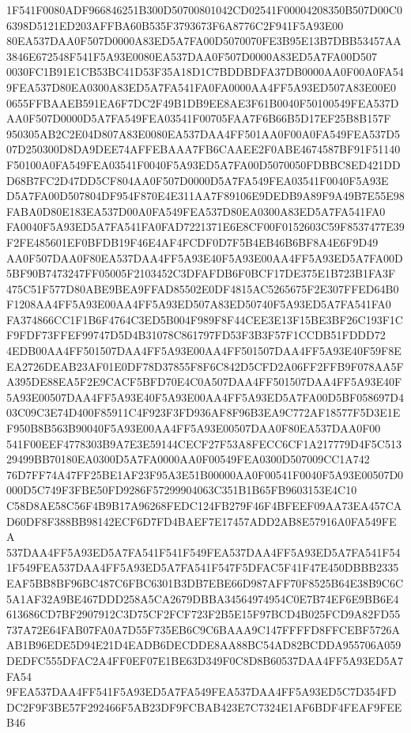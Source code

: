 \documentclass[UTF8,fontset=fandol,zihao=-4,a4paper]{ctexart}
\begin{document}
{{1F541F0080ADF966846251B300D50700801042CD02541F00004208350B507D00C06398D5121ED203AFFBA60B535F3793673F6A8776C2F941F5A93E00
80EA537DAA0F507D0000A83ED5A7FA00D5070070FE3B95E13B7DBB53457AA3846E672548F541F5A93E0080EA537DAA0F507D0000A83ED5A7FA00D507
0030FC1B91E1CB53BC41D53F35A18D1C7BDDBDFA37DB0000AA0F00A0FA549FEA537D80EA0300A83ED5A7FA541FA0FA0000AA4FF5A93ED507A83E00E0
0655FFBAAEB591EA6F7DC2F49B1DB9EE8AE3F61B0040F50100549FEA537DAA0F507D0000D5A7FA549FEA03541F00705FAA7F6B66B5D17EF25B8B157F
950305AB2C2E04D807A83E0080EA537DAA4FF501AA0F00A0FA549FEA537D507D250300D8DA9DEE74AFFEBAAA7FB6CAAEE2F0ABE4674587BF91F51140
F50100A0FA549FEA03541F0040F5A93ED5A7FA00D5070050FDBBC8ED421DDD68B7FC2D47DD5CF804AA0F507D0000D5A7FA549FEA03541F0040F5A93E
D5A7FA00D507804DF954F870E4E311AA7F89106E9DEDB9A89F9A49B7E55E98FABA0D80E183EA537D00A0FA549FEA537D80EA0300A83ED5A7FA541FA0
FA0040F5A93ED5A7FA541FA0FAD7221371E6E8CF00F0152603C59F8537477E39F2FE485601EF0BFDB19F46E4AF4FCDF0D7F5B4EB46B6BF8A4E6F9D49
AA0F507DAA0F80EA537DAA4FF5A93E40F5A93E00AA4FF5A93ED5A7FA00D5BF90B7473247FF05005F2103452C3DFAFDB6F0BCF17DE375E1B723B1FA3F
475C51F577D80ABE9BEA9FFAD85502E0DF4815AC5265675F2E307FFED64B0F1208AA4FF5A93E00AA4FF5A93ED507A83ED50740F5A93ED5A7FA541FA0
FA374866CC1F1B6F4764C3ED5B004F989F8F44CEE3E13F15BE3BF26C193F1CF9FDF73FFEF99747D5D4B31078C861797FD53F3B3F57F1CCDB51FDDD72
4EDB00AA4FF501507DAA4FF5A93E00AA4FF501507DAA4FF5A93E40F59F8EEA2726DEAB23AF01E0DF78D37855F8F6C842D5CFD2A06FF2FFB9F078AA5F
A395DE88EA5F2E9CACF5BFD70E4C0A507DAA4FF501507DAA4FF5A93E40F5A93E00507DAA4FF5A93E40F5A93E00AA4FF5A93ED5A7FA00D5BF058697D4
03C09C3E74D400F85911C4F923F3FD936AF8F96B3EA9C772AF18577F5D3E1EF950B8B563B90040F5A93E00AA4FF5A93E00507DAA0F80EA537DAA0F00
541F00EEF4778303B9A7E3E59144CECF27F53A8FECC6CF1A217779D4F5C51329499BB70180EA0300D5A7FA0000AA0F00549FEA0300D507009CC1A742
76D7FF74A47FF25BE1AF23F95A3E51B00000AA0F00541F0040F5A93E00507D0000D5C749F3FBE50FD9286F57299904063C351B1B65FB9603153E4C10
C58D8AE58C56F4B9B17A96268FEDC124FB279F46F4BFEEF09AA73EA457CAD60DF8F388BB98142ECF6D7FD4BAEF7E17457ADD2AB8E57916A0FA549FEA
537DAA4FF5A93ED5A7FA541F541F549FEA537DAA4FF5A93ED5A7FA541F541F549FEA537DAA4FF5A93ED5A7FA541F547F5DFAC5F41F47E450DBBB2335
EAF5BB8BF96BC487C6FBC6301B3DB7EBE66D987AFF70F8525B64E38B9C6C5A1AF32A9BE467DDD258A5CA2679DBBA34564974954C0E7B74EF6E9BB6E4
613686CD7BF2907912C3D75CF2FCF723F2B5E15F97BCD4B025FCD9A82FD55737A72E64FAB07FA0A7D55F735EB6C9C6BAAA9C147FFFFD8FFCEBF5726A
AB1B96EDE5D94E21D4EADB6DECDDE8AA88BC54AD82BCDDA955706A059DEDFC555DFAC2A4FF0EF07E1BE63D349F0C8D8B60537DAA4FF5A93ED5A7FA54
9FEA537DAA4FF541F5A93ED5A7FA549FEA537DAA4FF5A93ED5C7D354FDDC2F9F3BE57F292466F5AB23DF9FCBAB423E7C7324E1AF6BDF4FEAF9FEEB46
}}
\end{document}
